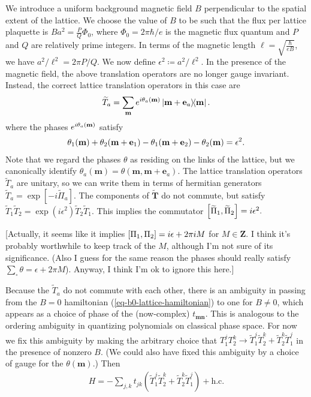 \documentclass[aps,prb,twocolumn,letterpaper,twoside,nobalancelastpage,groupedaddress,amsmath,amssymb,floatfix,citeautoscript]{revtex4-1}
\begin{document}
We introduce a uniform background magnetic field $B$ perpendicular to the spatial extent of the lattice. We choose the value of $B$ to be such that the flux per lattice plaquette is $Ba^2 = \frac{P}{Q}\Phi_0$, where $\Phi_0 = 2\pi \hbar /e$ is the magnetic flux quantum and $P$ and $Q$ are relatively prime integers. In terms of the magnetic length $\ell = \sqrt{\frac{\hbar}{eB}}$, we have $a^2/\ell^2 = 2 \pi P/Q$. We now define $\epsilon^2 \coloneqq a^2/\ell^2$. In the presence of the magnetic field, the above translation operators are no longer gauge invariant. Instead, the correct lattice translation operators in this case are
\begin{align*}
\widetilde{T}_a = \sum_{\mathbf{m}} e^{i\theta_a(\mathbf{m})} \dyad{\bfm + \mathbf{e}_a}{\bfm}.
\end{align*}
where the phases $e^{i\theta_a(\mathbf{m})}$ satisfy 
\begin{align*}
\theta_1(\mathbf{m}) + \theta_2(\mathbf{m} + \mathbf{e}_1) - \theta_1(\mathbf{m} + \mathbf{e}_2) - \theta_2(\mathbf{m}) = \epsilon^2.
\end{align*}
Note that we regard the phases $\theta$ as residing on the links of the lattice, but we canonically identify $\theta_a(\mathbf{m}) = \theta(\mathbf{m},\mathbf{m}+\mathbf{e}_a)$.
The lattice translation operators $\widetilde{T}_a$ are unitary, so we can write them in terms of hermitian generators $\widetilde{T}_a = \exp\left[-i \widetilde{\Pi}_a\right]$. The components of $\widetilde{\mathbf{T}}$ do not commute, but satisfy $\widetilde{T}_1 \widetilde{T}_2 = \exp(i\epsilon^2) \widetilde{T}_2 \widetilde{T}_1 $. This implies the commutator
$\comm{\widetilde{\Pi}_1}{\widetilde{\Pi}_2} = i \epsilon^2.$

[Actually, it seems like it implies $\comm{\Pi_1}{\Pi_2} = i \epsilon + 2\pi i M$ for $M \in \mathbf{Z}$. I think it's probably worthwhile to keep track of the $M$, although I'm not sure of its significance. (Also I guess for the same reason the phases should really satisfy $\sum_{\square}\theta = \epsilon + 2\pi M$). Anyway, I think I'm ok to ignore this here.]

Because the $\widetilde{T}_a$ do not commute with each other, there is an ambiguity in passing from the $B=0$ hamiltonian (\ref{eq-b0-lattice-hamiltonian}) to one for $B\neq0$, which appears as a choice of phase of the (now-complex) $t_{\mathbf{m}\mathbf{n}}$. This is analogous to the ordering ambiguity in quantizing polynomials on classical phase space. For now we fix this ambiguity by making the arbitrary choice that $T_1^j T_2^k \rightarrow \widetilde{T}_1^j \widetilde{T}_2^k + \widetilde{T}_2^k\widetilde{T}_1^j$ in the presence of nonzero $B$. (We could also have fixed this ambiguity by a choice of gauge for the $\theta(\mathbf{m})$.) Then
\begin{align*}
H = -\sum_{j,k} t_{jk}\left(\widetilde{T}_1^j \widetilde{T}_2^k + \widetilde{T}_2^k\widetilde{T}_1^j\right) + \text{h.c.}
\end{align*}
\end{document}

